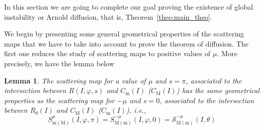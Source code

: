 \documentclass[a4paper,10pt]{article}
\newcommand{\M}{\text{M}}
\newcommand{\m}{\text{m}}
\newtheorem{lemma}[theorem]{Lemma}
\theoremstyle{definition}
\begin{document}
In this section we are going to complete our goal proving the existence of global instability or Arnold diffusion, that is, Theorem~\ref{theo:main_theo}.

We begin by presenting some general geometrical properties of the scattering maps that we have to take into account to prove the theorem of diffusion.
The first one reduces the study of scattering maps to positive values of $\mu$.
More precisely, we have the lemma below
\begin{lemma}\label{lem:geometrical_lemmas}
The scattering map for a value of $\mu$ and $s = \pi$, associated to the intersection between $R(I,\varphi,s)$ and $C_{\m}(I)$ ($C_{\M}(I)$) has the same geometrical properties as the scattering map for $-\mu$ and $s = 0$, associated to the intersection between $R_{\theta}(I)$ and $C_{\M}(I)$ ($C_{\m}(I)$), i.e.,
\begin{equation*}\label{eq:equivalence_sign_mu}
S^{\mu}_{\text{m}(\M)}(I,\varphi,\pi) = S^{-\mu}_{\text{M}(\m)}(I,\varphi,0) = \mathcal{S}^{-\mu}_{\M(\m)}(I,\theta)
\end{equation*}
\end{lemma}
\end{document}
